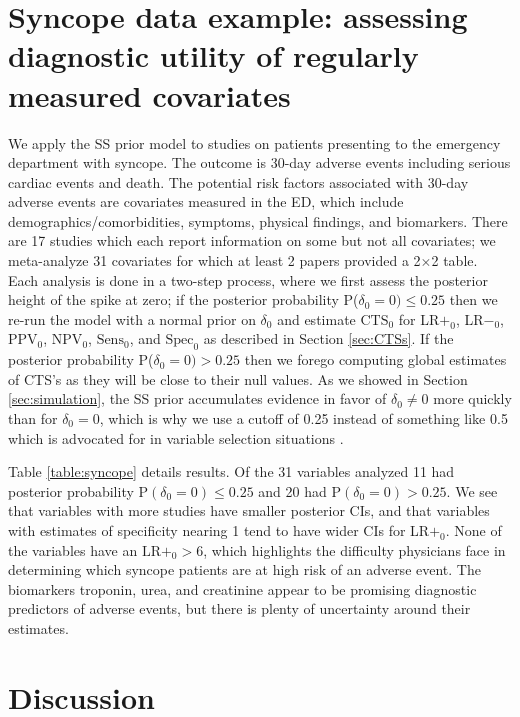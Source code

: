 \documentclass[AMA,STIX1COL]{WileyNJD-v2}
\begin{document}
\section{Syncope data example: assessing diagnostic utility of regularly measured covariates} \label{sec:syncope}

We apply the SS prior model to studies on patients presenting to the emergency department with syncope. The outcome is 30-day adverse events including serious cardiac events and death. The potential risk factors associated with 30-day adverse events are covariates measured in the ED, which include demographics/comorbidities, symptoms, physical findings, and biomarkers. There are 17 studies which each report information on some but not all covariates; we meta-analyze 31 covariates for which at least 2 papers provided a 2$\times$2 table. Each analysis is done in a two-step process, where we first assess the posterior height of the spike at zero; if the posterior probability P($\delta_0 = 0) \le 0.25$ then we re-run the model with a normal prior on $\delta_0$ and estimate $\mbox{CTS}_0$ for LR$+_0$, LR$-_0$, $\mbox{PPV}_0$, $\mbox{NPV}_0$, $\mbox{Sens}_0$, and $\mbox{Spec}_0$ as described in Section \ref{sec:CTSs}. If the posterior probability P($\delta_0 = 0) > 0.25$ then we forego computing global estimates of CTS's as they will be close to their null values. As we showed in Section \ref{sec:simulation}, the SS prior accumulates evidence in favor of $\delta_0 \ne 0$ more quickly than for $\delta_0 = 0$, which is why we use a cutoff of 0.25 instead of something like 0.5 which is advocated for in variable selection situations \cite{barbieri2004}. 

Table \ref{table:syncope} details results. Of the 31 variables analyzed 11 had posterior probability $\mbox{P}(\delta_0 = 0) \le 0.25$ and 20 had $\mbox{P}(\delta_0 = 0) > 0.25$. We see that variables with more studies have smaller posterior CIs, and that variables with estimates of specificity nearing 1 tend to have wider CIs for LR$+_0$. None of the variables have an $\mbox{LR}+_0 > 6$, which highlights the difficulty physicians face in determining which syncope patients are at high risk of an adverse event. The biomarkers troponin, urea, and creatinine appear to be promising diagnostic predictors of adverse events, but there is plenty of uncertainty around their estimates. 

\section{Discussion}
\end{document}
